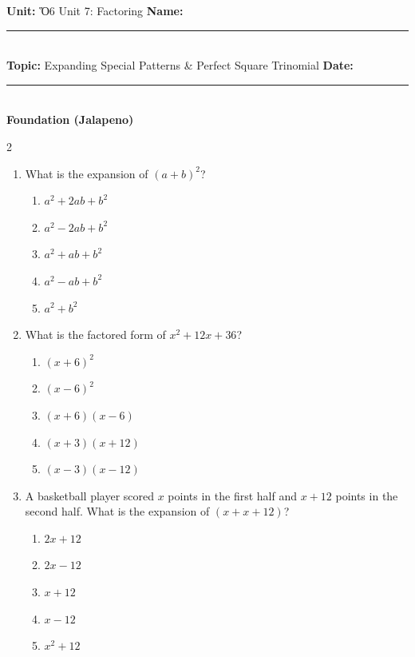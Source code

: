 \documentclass[10pt]{article}
\begin{document}
\enlargethispage{2.5cm}

\begin{tcolorbox}[colback=mainblue!5, colframe=mainblue, sharp corners, boxrule=0.5pt]
    \small \textbf{Unit:} Ὅ6 Unit 7: Factoring \hfill \textbf{Name:} \rule{3cm}{0.4pt} \\
    \small \textbf{Topic:} Expanding Special Patterns & Perfect Square Trinomial \hfill \textbf{Date:} \rule{2cm}{0.4pt} \\
    \centering \textbf{\large Foundation (Jalapeno)}
\end{tcolorbox}

\vspace{0.2cm}

\begin{multicols}{2}
\begin{enumerate}[label=\textbf{Q\arabic*.}, leftmargin=*, itemsep=6pt, parsep=0pt]

  \item \small What is the expansion of $(a+b)^2$?
  \begin{enumerate}[label=(\Alph*), leftmargin=0.6cm, nosep, itemsep=2pt]
    \item $a^2 + 2ab + b^2$
    \item $a^2 - 2ab + b^2$
    \item $a^2 + ab + b^2$
    \item $a^2 - ab + b^2$
    \item $a^2 + b^2$
  \end{enumerate}

  \item \small What is the factored form of $x^2 + 12x + 36$?
  \begin{enumerate}[label=(\Alph*), leftmargin=0.6cm, nosep, itemsep=2pt]
    \item $(x+6)^2$
    \item $(x-6)^2$
    \item $(x+6)(x-6)$
    \item $(x+3)(x+12)$
    \item $(x-3)(x-12)$
  \end{enumerate}

  \item \small A basketball player scored $x$ points in the first half and $x+12$ points in the second half. What is the expansion of $(x+x+12)$?
  \begin{enumerate}[label=(\Alph*), leftmargin=0.6cm, nosep, itemsep=2pt]
    \item $2x+12$
    \item $2x-12$
    \item $x+12$
    \item $x-12$
    \item $x^2+12$
  \end{enumerate}


\end{enumerate}
\end{multicols}
\end{document}
